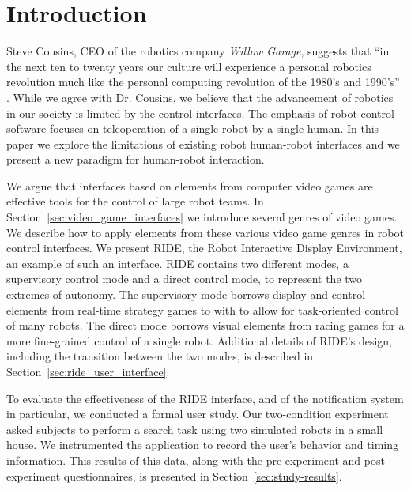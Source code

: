 \chapter{Introduction}
Steve Cousins, CEO of the robotics company \emph{Willow Garage}, suggests that ``in the next ten to twenty years our culture will experience a personal robotics revolution much like the personal computing revolution of the 1980's and 1990's'' \cite{Cousins}. While we agree with Dr. Cousins, we believe that the advancement of robotics in our society is limited by the control interfaces. The emphasis of robot control software focuses on teleoperation of a single robot by a single human. In this paper we explore the limitations of existing robot human-robot interfaces and we present a new paradigm for human-robot interaction.


We argue that interfaces based on elements from computer video games are effective tools for the control of large robot teams. In Section~\ref{sec:video_game_interfaces} we introduce several genres of video games. We describe how to apply elements from these various video game genres in robot control interfaces. We present RIDE, the Robot Interactive Display Environment, an example of such an interface. RIDE contains two different modes, a supervisory control mode and a direct control mode, to represent the two extremes of autonomy. The supervisory mode borrows display and control elements from real-time strategy games to with to allow for task-oriented control of many robots. The direct mode borrows visual elements from racing games for a more fine-grained control of a single robot. Additional details of RIDE's design, including the transition between the two modes, is described in Section~\ref{sec:ride_user_interface}.

To evaluate the effectiveness of the RIDE interface, and of the notification system in particular, we conducted a formal user study. Our two-condition experiment asked subjects to perform a search task using two simulated robots in a small house. We instrumented the application to record the user's behavior and timing information. This results of this data, along with the pre-experiment and post-experiment questionnaires, is presented in Section~\ref{sec:study-results}.